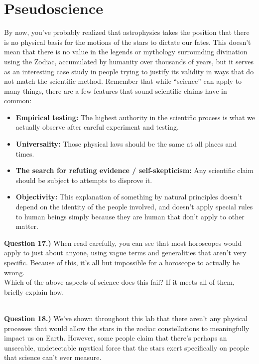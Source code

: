\documentclass[11pt]{article}
\begin{document}
\section{Pseudoscience}
By now, you've probably realized that astrophysics takes the position that there is no physical basis for the motions of the stars to dictate our fates. This doesn't mean that there is no value in the legends or mythology surrounding divination using the Zodiac, accumulated by humanity over thousands of years, but it serves as an interesting case study in people trying to justify its validity in ways that do not match the scientific method. Remember that while ``science'' can apply to many things, there are a few features that sound scientific claims have in common:
\begin{itemize}
	
	\item \textbf{Empirical testing:} The highest authority in the scientific process is what we actually observe after careful experiment and testing.\\
	\item \textbf{Universality:} Those physical laws should be the same at all places and times.\\
	\item \textbf{The search for refuting evidence / self-skepticism:} Any scientific claim should be subject to attempts to disprove it.\\
	\item \textbf{Objectivity:} This explanation of something by natural principles doesn't depend on the identity of the people involved, and doesn't apply special rules to human beings simply because they are human that don't apply to other matter.
	
\end{itemize}
\newpage

\textbf{Question 17.)} When read carefully, you can see that most horoscopes would apply to just about anyone, using vague terms and generalities that aren't very specific. Because of this, it's all but impossible for a horoscope to actually be wrong.\\

Which of the above aspects of science does this fail? If it meets all of them, briefly explain how. 

\vspace{5.5cm}
\hrulefill\\


\textbf{Question 18.)} We've shown throughout this lab that there aren't any physical processes that would allow the stars in the zodiac constellations to meaningfully impact us on Earth. However, some people claim that there's perhaps an unseeable, undetectable mystical force that the stars exert specifically on people that science can't ever measure.\\
\end{document}

